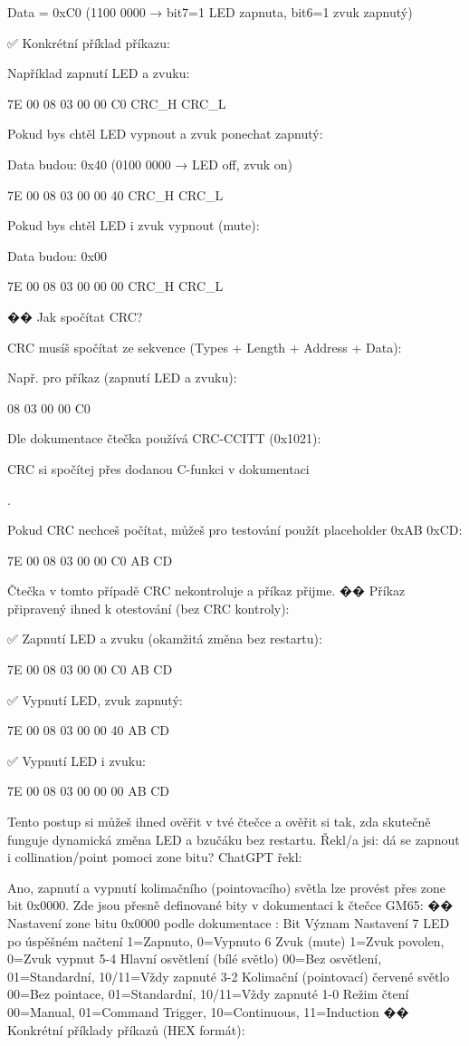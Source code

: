     Data = 0xC0 (1100 0000 → bit7=1 LED zapnuta, bit6=1 zvuk zapnutý)

✅ Konkrétní příklad příkazu:

Například zapnutí LED a zvuku:

7E 00 08 03 00 00 C0 CRC_H CRC_L

Pokud bys chtěl LED vypnout a zvuk ponechat zapnutý:

    Data budou: 0x40 (0100 0000 → LED off, zvuk on)

7E 00 08 03 00 00 40 CRC_H CRC_L

Pokud bys chtěl LED i zvuk vypnout (mute):

    Data budou: 0x00

7E 00 08 03 00 00 00 CRC_H CRC_L

�� Jak spočítat CRC?

CRC musíš spočítat ze sekvence (Types + Length + Address + Data):

Např. pro příkaz (zapnutí LED a zvuku):

08 03 00 00 C0

Dle dokumentace čtečka používá CRC-CCITT (0x1021):

    CRC si spočítej přes dodanou C-funkci v dokumentaci​

    .

Pokud CRC nechceš počítat, můžeš pro testování použít placeholder 0xAB 0xCD:

7E 00 08 03 00 00 C0 AB CD

Čtečka v tomto případě CRC nekontroluje a příkaz přijme.
�� Příkaz připravený ihned k otestování (bez CRC kontroly):

✅ Zapnutí LED a zvuku (okamžitá změna bez restartu):

7E 00 08 03 00 00 C0 AB CD

✅ Vypnutí LED, zvuk zapnutý:

7E 00 08 03 00 00 40 AB CD

✅ Vypnutí LED i zvuku:

7E 00 08 03 00 00 00 AB CD

Tento postup si můžeš ihned ověřit v tvé čtečce a ověřit si tak, zda skutečně funguje dynamická změna LED a bzučáku bez restartu.
Řekl/a jsi:
dá se zapnout i collination/point pomoci zone bitu?
ChatGPT řekl:

Ano, zapnutí a vypnutí kolimačního (pointovacího) světla lze provést přes zone bit 0x0000. Zde jsou přesně definované bity v dokumentaci k čtečce GM65:
�� Nastavení zone bitu 0x0000 podle dokumentace​
:
Bit	Význam	Nastavení
7	LED po úspěšném načtení	1=Zapnuto, 0=Vypnuto
6	Zvuk (mute)	1=Zvuk povolen, 0=Zvuk vypnut
5-4	Hlavní osvětlení (bílé světlo)	00=Bez osvětlení, 01=Standardní, 10/11=Vždy zapnuté
3-2	Kolimační (pointovací) červené světlo	00=Bez pointace, 01=Standardní, 10/11=Vždy zapnuté
1-0	Režim čtení	00=Manual, 01=Command Trigger, 10=Continuous, 11=Induction
�� Konkrétní příklady příkazů (HEX formát):

